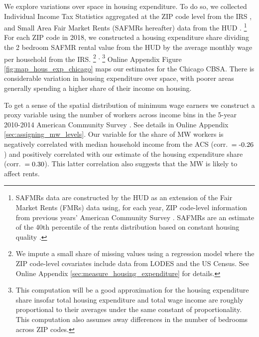 
We explore variations over space in housing expenditure.
To do so, we collected Individual Income Tax Statistics aggregated at the 
ZIP code level from the IRS \parencite{IRS},
and Small Area Fair Market Rents (SAFMRs hereafter) data from the HUD 
\parencite{hudSAFMR}.%
\footnote{SAFMRs data are constructed by the HUD as an extension of the
    Fair Market Rents (FMRs) data using, for each year, ZIP code-level information
    from previous years' American Community Survey 
    \parencite[][, p.\ 35]{SafmrReport2018}.
    SAFMRs are an estimate of the 40th percentile of the rents distribution
    based on constant housing quality \parencite[][, p.\ 1]{SafmrReport2018}.}
For each ZIP code in 2018, we constructed a housing expenditure share dividing 
the 2 bedroom SAFMR rental value from the HUD by the average monthly wage per 
household from the IRS.%
\footnote{We impute a small share of missing values using a regression model 
	where the ZIP code-level covariates include data from LODES and the US 
	Census.
	See Online Appendix \ref{sec:measure_housing_expenditure} for details.}%
\textsuperscript{,}%
\footnote{This computation will be a good approximation for the housing 
	expenditure share insofar total housing expenditure and total wage income 
	are roughly proportional to their averages under the same constant of 
	proportionality.
	This computation also assumes away differences in the number of bedrooms 
	across ZIP codes.}
Online Appendix Figure \ref{fig:map_hous_exp_chicago} maps our estimates for the 
Chicago CBSA.
There is considerable variation in housing expenditure over space, with poorer
areas generally spending a higher share of their income on housing.

To get a sense of the spatial distribution of minimum wage earners we construct 
a proxy variable using the number of workers across income bins in the 5-year 
2010-2014 American Community Survey \parencite[ACS;][]{CensusACS}.
See details in Online Appendix \ref{sec:assigning_mw_levels}.
Our variable for the share of MW workers is negatively correlated with median 
household income from the ACS (corr.\ $=\textnormal{-0.26}$) and 
positively correlated with our estimate of the housing expenditure share 
(corr.\ $=\textnormal{0.30}$).
This latter correlation also suggests that the MW is likely to affect rents.

